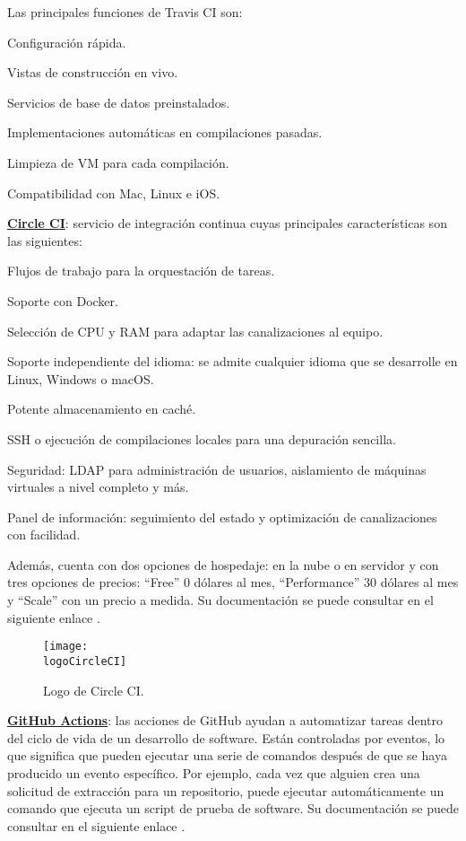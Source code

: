 \begin{compactitem}
    Las principales funciones de Travis CI son:
    \begin{compactitem}
        \item Configuración rápida.
        \item Vistas de construcción en vivo.
        \item Servicios de base de datos preinstalados.
        \item Implementaciones automáticas en compilaciones pasadas.
        \item Limpieza de VM para cada compilación.
        \item Compatibilidad con Mac, Linux e iOS.
    \end{compactitem}
    \item \textbf{\underline{Circle CI}}: servicio de integración continua cuyas principales características son las siguientes:
    \begin{compactitem}
        \item Flujos de trabajo para la orquestación de tareas.
        \item Soporte con Docker.
        \item Selección de CPU y RAM para adaptar las canalizaciones al equipo.
        \item Soporte independiente del idioma: se admite cualquier idioma que se desarrolle en Linux, Windows o macOS.
        \item Potente almacenamiento en caché.
        \item SSH o ejecución de compilaciones locales para una depuración sencilla.
        \item Seguridad: LDAP para administración de usuarios, aislamiento de máquinas virtuales a nivel completo y más.
        \item Panel de información: seguimiento del estado y optimización de canalizaciones con facilidad.
    \end{compactitem}
    Además, cuenta con dos opciones de hospedaje: en la nube o en servidor y con tres opciones de precios: ``Free'' 0 dólares al mes, ``Performance'' 30 dólares al mes y ``Scale'' con un precio a medida. Su documentación se puede consultar en el siguiente enlace \cite{circleCI}.
    \begin{figure}[h]
        \centering
        \texttt{[image: \\logoCircleCI]}
        \caption{Logo de Circle CI.}
    \end{figure}
    \item \textbf{\underline{GitHub Actions}}: las acciones de GitHub ayudan a automatizar tareas dentro del ciclo de vida de un desarrollo de software. Están controladas por eventos, lo que significa que pueden ejecutar una serie de comandos después de que se haya producido un evento específico. Por ejemplo, cada vez que alguien crea una solicitud de extracción para un repositorio, puede ejecutar automáticamente un comando que ejecuta un script de prueba de software. Su documentación se puede consultar en el siguiente enlace \cite{githubActions}.

\end{compactitem}

